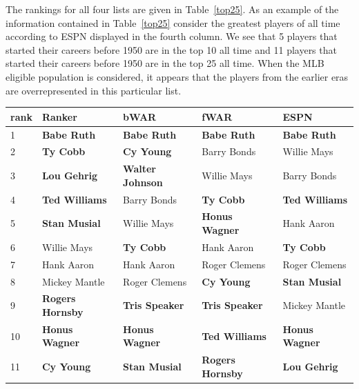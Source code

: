 \documentclass[11pt]{article}\usepackage[]{graphicx}\usepackage[]{color}
\begin{document}
The rankings for all four lists are given in Table~\ref{top25}.  
As an example of the information contained in Table~\ref{top25} consider 
the greatest players of all time according to ESPN  
displayed in the fourth column.  
We see that 5 players that started their careers before 1950 are in the top 10 
all time and 11 players that started their careers before 1950 are in the top 
25 all time.  When the MLB eligible population is considered, it appears that 
the players from the earlier eras are overrepresented in this particular list.  




\begin{table}[h!]
\begin{center}
\begin{tabular}{lllll}
\hline
rank & Ranker & bWAR & fWAR & ESPN \\
\hline
1  & {\bf Babe Ruth}         & {\bf Babe Ruth}      & {\bf Babe Ruth}      & {\bf Babe Ruth}      \\
2  & {\bf Ty Cobb}           & {\bf Cy Young}       & Barry Bonds          & Willie Mays          \\
3  & {\bf Lou Gehrig}        & {\bf Walter Johnson} & Willie Mays          & Barry Bonds          \\
4  & {\bf Ted Williams}      & Barry Bonds          & {\bf Ty Cobb}        & {\bf Ted Williams}   \\
5  & {\bf Stan Musial}       & Willie Mays          & {\bf Honus Wagner}   & Hank Aaron           \\
6  & Willie Mays             & {\bf Ty Cobb}        & Hank Aaron           & {\bf Ty Cobb}        \\
7  & Hank Aaron              & Hank Aaron           & Roger Clemens        & Roger Clemens        \\
8  & Mickey Mantle           & Roger Clemens        & {\bf Cy Young}       & {\bf Stan Musial}    \\
9  & {\bf Rogers Hornsby}    & {\bf Tris Speaker}   & {\bf Tris Speaker}   & Mickey Mantle        \\
10 & {\bf Honus Wagner}      & {\bf Honus Wagner}   & {\bf Ted Williams}   & {\bf Honus Wagner}   \\
11 & {\bf Cy Young}          & {\bf Stan Musial}    & {\bf Rogers Hornsby} & {\bf Lou Gehrig}     \\

\end{tabular}
\end{center}
\end{table}
\end{document}
